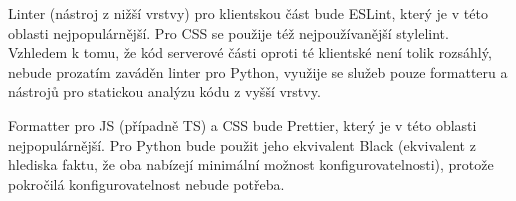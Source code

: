 Linter (nástroj z nižší vrstvy) pro klientskou část bude ESLint, který je v této oblasti nejpopulárnější. Pro CSS se použije též nejpoužívanější stylelint. Vzhledem k tomu, že kód serverové části oproti té klientské není tolik rozsáhlý, nebude prozatím zaváděn linter pro Python, využije se služeb pouze formatteru a nástrojů pro statickou analýzu kódu z vyšší vrstvy.

Formatter pro JS (případně TS) a CSS bude Prettier, který je v této oblasti nejpopulárnější. Pro Python bude použit jeho ekvivalent Black (ekvivalent z hlediska faktu, že oba nabízejí minimální možnost konfigurovatelnosti), protože pokročilá konfigurovatelnost nebude potřeba.

